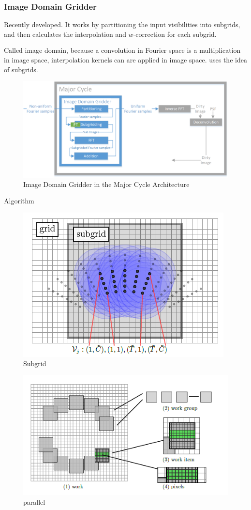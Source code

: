 \subsubsection{Image Domain Gridder}\label{hypo:idg}
Recently developed\cite{veenboer2017image}. It works by partitioning the input visibilities into subgrids, and then calculates the interpolation and $w$-correction for each subgrid.

Called image domain, because a convolution in Fourier space is a multiplication in image space, interpolation kernels can are applied in image space. uses the idea of subgrids.

\begin{figure}[h]
	\centering
	\includegraphics[width=0.80\linewidth]{./chapters/03.distribution/idg/major-minor-idg.png}
	\caption{Image Domain Gridder in the Major Cycle Architecture}
	\label{distribution:idg:system}
\end{figure}

Algorithm
\begin{figure}[h]
	\centering
	\includegraphics[width=0.40\linewidth]{./chapters/03.distribution/idg/subgrid.png}
	\caption{Subgrid}
	\label{distribution:idg:subgrid}
\end{figure}

\begin{figure}[h]
	\centering
	\includegraphics[width=0.40\linewidth]{./chapters/03.distribution/idg/paralellization.png}
	\caption{parallel}
	\label{distribution:idg:parallel}
\end{figure}

